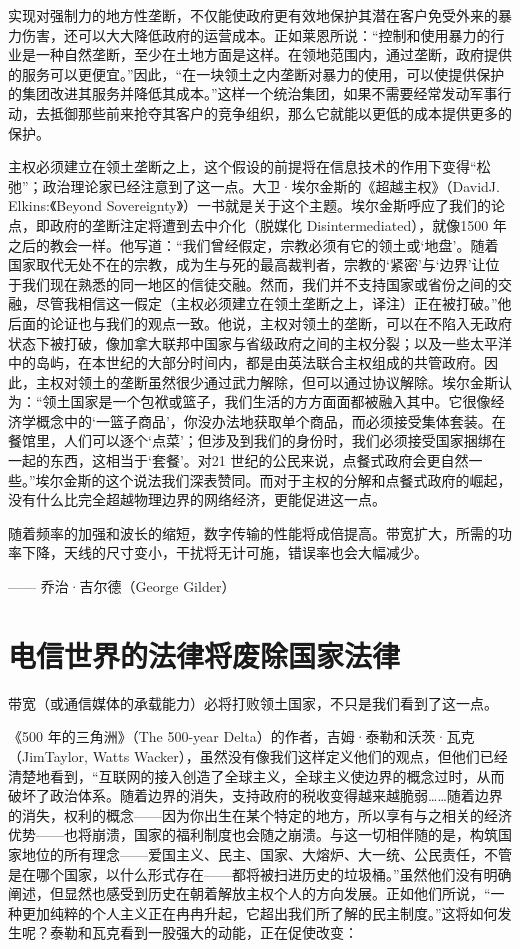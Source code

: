 实现对强制力的地方性垄断，不仅能使政府更有效地保护其潜在客户免受外来的暴力伤害，还可以大大降低政府的运营成本。正如莱恩所说：“控制和使用暴力的行业是一种自然垄断，至少在土地方面是这样。在领地范围内，通过垄断，政府提供的服务可以更便宜。”因此，“在一块领土之内垄断对暴力的使用，可以使提供保护的集团改进其服务并降低其成本。”这样一个统治集团，如果不需要经常发动军事行动，去抵御那些前来抢夺其客户的竞争组织，那么它就能以更低的成本提供更多的保护。

主权必须建立在领土垄断之上，这个假设的前提将在信息技术的作用下变得“松弛”；政治理论家已经注意到了这一点。大卫·埃尔金斯的《超越主权》（DavidJ. Elkins:《Beyond Sovereignty》）一书就是关于这个主题。埃尔金斯呼应了我们的论点，即政府的垄断注定将遭到去中介化（脱媒化 Disintermediated），就像1500 年之后的教会一样。他写道：“我们曾经假定，宗教必须有它的领土或‘地盘’。随着国家取代无处不在的宗教，成为生与死的最高裁判者，宗教的‘紧密’与‘边界’让位于我们现在熟悉的同一地区的信徒交融。然而，我们并不支持国家或省份之间的交融，尽管我相信这一假定（主权必须建立在领土垄断之上，译注）正在被打破。”他后面的论证也与我们的观点一致。他说，主权对领土的垄断，可以在不陷入无政府状态下被打破，像加拿大联邦中国家与省级政府之间的主权分裂；以及一些太平洋中的岛屿，在本世纪的大部分时间内，都是由英法联合主权组成的共管政府。因此，主权对领土的垄断虽然很少通过武力解除，但可以通过协议解除。埃尔金斯认为：“领土国家是一个包袱或篮子，我们生活的方方面面都被融入其中。它很像经济学概念中的‘一篮子商品’，你没办法地获取单个商品，而必须接受集体套装。在餐馆里，人们可以逐个‘点菜’；但涉及到我们的身份时，我们必须接受国家捆绑在一起的东西，这相当于‘套餐’。对21 世纪的公民来说，点餐式政府会更自然一些。”埃尔金斯的这个说法我们深表赞同。而对于主权的分解和点餐式政府的崛起，没有什么比完全超越物理边界的网络经济，更能促进这一点。


\begin{tcolorbox}
随着频率的加强和波长的缩短，数字传输的性能将成倍提高。带宽扩大，所需的功率下降，天线的尺寸变小，干扰将无计可施，错误率也会大幅减少。
\begin{flushright}
—— 乔治·吉尔德（George Gilder）    
\end{flushright}
\end{tcolorbox}


\section{电信世界的法律将废除国家法律}

带宽（或通信媒体的承载能力）必将打败领土国家，不只是我们看到了这一点。

《500 年的三角洲》（The 500-year Delta）的作者，吉姆·泰勒和沃茨·瓦克（JimTaylor, Watts Wacker），虽然没有像我们这样定义他们的观点，但他们已经清楚地看到，“互联网的接入创造了全球主义，全球主义使边界的概念过时，从而破坏了政治体系。随着边界的消失，支持政府的税收变得越来越脆弱……随着边界的消失，权利的概念——因为你出生在某个特定的地方，所以享有与之相关的经济优势——也将崩溃，国家的福利制度也会随之崩溃。与这一切相伴随的是，构筑国家地位的所有理念——爱国主义、民主、国家、大熔炉、大一统、公民责任，不管是在哪个国家，以什么形式存在——都将被扫进历史的垃圾桶。”虽然他们没有明确阐述，但显然也感受到历史在朝着解放主权个人的方向发展。正如他们所说，“一种更加纯粹的个人主义正在冉冉升起，它超出我们所了解的民主制度。”这将如何发生呢？泰勒和瓦克看到一股强大的动能，正在促使改变：

